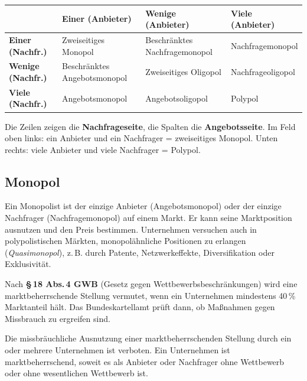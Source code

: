 \documentclass[11pt, a4paper]{article}
\begin{document}
\begin{center}
\begin{tabular}{p{2cm} p{3.5cm} p{3.5cm} p{3.5cm}}
\toprule
\textbf{} & \textbf{Einer (Anbieter)} & \textbf{Wenige (Anbieter)} & \textbf{Viele (Anbieter)}\\
\midrule
\textbf{Einer (Nachfr.)} & Zweiseitiges Monopol & Beschränktes Nachfragemonopol & Nachfragemonopol\\
\addlinespace
\textbf{Wenige (Nachfr.)} & Beschränktes Angebotsmonopol & Zweiseitiges Oligopol & Nachfrageoligopol\\
\addlinespace
\textbf{Viele (Nachfr.)} & Angebotsmonopol & Angebotsoligopol & Polypol\\
\bottomrule
\end{tabular}
\end{center}

\begin{merksatz}[title={\bfseries Merke: Lesart der Matrix}]
Die Zeilen zeigen die \textbf{Nachfrageseite}, die Spalten die \textbf{Angebotsseite}.
Im Feld oben links: ein Anbieter und ein Nachfrager = zweiseitiges Monopol. Unten rechts:
viele Anbieter und viele Nachfrager = Polypol.
\end{merksatz}

\subsection{Monopol}

Ein Monopolist ist der einzige Anbieter (Angebotsmonopol) oder der einzige Nachfrager
(Nachfragemonopol) auf einem Markt. Er kann seine Marktposition ausnutzen und den Preis
bestimmen. Unternehmen versuchen auch in polypolistischen Märkten, monopolähnliche
Positionen zu erlangen (\emph{Quasimonopol}), z.\,B. durch Patente, Netzwerkeffekte,
Diversifikation oder Exklusivität.

Nach \textbf{§\,18 Abs.\,4 GWB} (Gesetz gegen Wettbewerbsbeschränkungen) wird eine
marktbeherrschende Stellung vermutet, wenn ein Unternehmen mindestens 40\,\% Marktanteil
hält. Das Bundeskartellamt prüft dann, ob Maßnahmen gegen Missbrauch zu ergreifen sind.

\begin{merksatz}[title={\bfseries § 19 GWB --- Missbrauchsverbot}]
Die missbräuchliche Ausnutzung einer marktbeherrschenden Stellung durch ein oder mehrere
Unternehmen ist verboten. Ein Unternehmen ist marktbeherrschend, soweit es als Anbieter
oder Nachfrager ohne Wettbewerb oder ohne wesentlichen Wettbewerb ist.
\end{merksatz}
\end{document}
